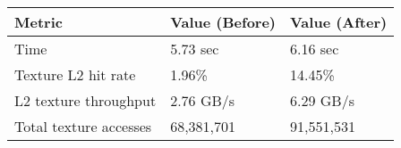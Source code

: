 \begin{center}\vspace{1cm}
\small
\begin{tabular}{l l l}
\toprule
    \bf{Metric}					& \bf{Value (Before)} & \bf{Value (After)}\\
\midrule
    Time 	& 5.73 sec  & 6.16 sec\\
    Texture L2 hit rate 		& 1.96\%  & 14.45\%  \\
    L2 texture throughput		& 2.76 GB/s & 6.29 GB/s\\
    Total texture accesses		& 68,381,701 & 91,551,531\\
\bottomrule
\end{tabular}
\end{center}\vspace{1cm}

